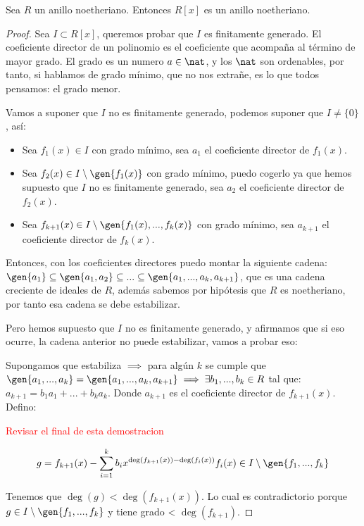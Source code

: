 \begin{theorem}\label{thm:tma_base_hilbert}
	Sea $R$ un anillo noetheriano. Entonces $R[x]$ es un anillo noetheriano.
\end{theorem}

\begin{proof}
	Sea $I \subset R[x]$, queremos probar que $I$ es finitamente generado.
	\nota El coeficiente director de un polinomio es el coeficiente que acompaña al término de mayor grado.
	\nota El grado es un numero $a \in \nat$, y los $\nat$ son ordenables, por tanto, si hablamos de grado mínimo, que no nos extrañe, es lo que todos pensamos: el grado menor.

	Vamos a suponer que $I$ no es finitamente generado, podemos suponer que $I\neq \{0\}$, así:
	\begin{itemize}
		\item Sea $f_1(x) \in I$ con grado mínimo, sea $a_1$ el coeficiente director de $f_1(x)$.
		\item Sea $f_2(x) \in I\setminus \gen{f_1(x)}$ con grado mínimo, puedo cogerlo ya que hemos supuesto que $I$ no es finitamente generado, sea $a_2$ el coeficiente director de $f_2(x)$.
		\item Sea $f_{k+1}(x) \in I\setminus \gen{f_1(x),...,f_k(x)}$ con grado mínimo, sea $a_{k+1}$ el coeficiente director de $f_k(x)$.
	\end{itemize}

	Entonces, con los coeficientes directores puedo montar la siguiente cadena: $\gen{a_1} \subseteq \gen{a_1,a_2} \subseteq ... \subseteq \gen{a_1,...,a_k,a_{k+1}}$, que es una cadena creciente de ideales de $R$, además sabemos por hipótesis que $R$ es noetheriano, por tanto esa cadena se debe estabilizar.

	Pero hemos supuesto que $I$ no es finitamente generado, y afirmamos que si eso ocurre, la cadena anterior no puede estabilizar, vamos a probar eso:

	Supongamos que estabiliza $\implies$ para algún $k$ se cumple que $\gen{a_1,...,a_k}=\gen{a_1,...,a_k,a_{k+1}} \implies \exists b_1,...,b_k \in R$ tal que: $a_{k+1}=b_1a_1+...+b_ka_k$. Donde $a_{k+1}$ es el coeficiente director de $f_{k+1}(x)$. Defino:

	\textcolor{red}{Revisar el final de esta demostracion}

	$$ g=f_{k+1}(x)-\sum_{i=1}^{k}b_ix^{\deg(f_{k+1}(x))-\deg(f_i(x))} f_i(x) \in I\setminus \gen{f_1,...,f_k} $$


	Tenemos que $\deg(g) < \deg(f_{k+1}(x))$. Lo cual es contradictorio porque $g \in I \setminus \gen{f_1,...,f_k}$ y tiene grado < $\deg(f_{k+1})$.

\end{proof}

